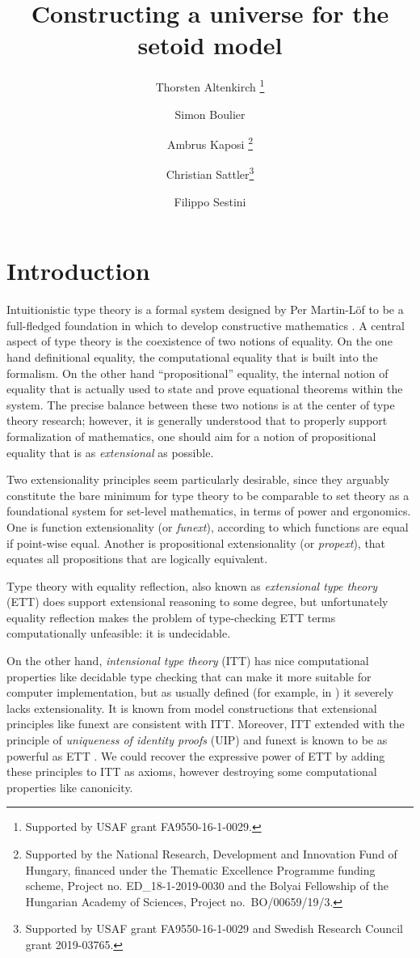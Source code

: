 \documentclass{easychair}
\title{Constructing a universe for the setoid model}
\author{
  Thorsten Altenkirch \inst{1}\thanks{Supported by USAF grant FA9550-16-1-0029.}
\and
  Simon Boulier \inst{2}
\and
  Ambrus Kaposi \inst{3}\thanks{Supported by the National Research, Development and Innovation Fund of Hungary, financed under the Thematic Excellence Programme funding scheme, Project no. ED\_18-1-2019-0030 and the Bolyai Fellowship of the Hungarian Academy of Sciences, Project no.\ BO/00659/19/3.}
\and
  Christian Sattler\inst{4}\thanks{Supported by USAF grant FA9550-16-1-0029 and Swedish Research Council grant 2019-03765.}
\and
  Filippo Sestini\inst{1}
}
\institute{
  School of Computer Science, University of Nottingham, UK\\
  \email{\{psztxa,pszcs1,psxfs5\}@nottingham.ac.uk}
  \and
  Inria, Nantes, France \\
  \email{simon.boulier@inria.fr}
  \and
  E{\"o}tv{\"o}s Lor{\'a}nd University, Budapest, Hungary\\
  \email{akaposi@inf.elte.hu}
  \and
  Chalmers University of Technology, Gothenburg, Sweden
  \email{sattler@chalmers.se}
}
\begin{document}
\maketitle

\section{Introduction}

Intuitionistic type theory is a formal system designed by Per Martin-L\"of to be
a full-fledged foundation in which to develop constructive mathematics
\cite{mltt75, libretto}.
%
A central aspect of type theory is the coexistence of two notions of
equality. On the one hand definitional equality, the computational equality that
is built into the formalism. On the other hand ``propositional'' equality, the
internal notion of equality that is actually used to state and prove equational
theorems within the system. The precise balance between these two notions is at
the center of type theory research; however, it is generally understood that to
properly support formalization of mathematics, one should aim for a notion of
propositional equality that is as \emph{extensional} as possible.

Two extensionality principles seem particularly desirable, since they arguably
constitute the bare minimum for type theory to be comparable to set theory as a
foundational system for set-level mathematics, in terms of power and ergonomics.
One is function extensionality (or \emph{funext}), according to which functions
are equal if point-wise equal. Another is propositional extensionality
(or \emph{propext}), that equates all propositions that are logically equivalent.

Type theory with equality reflection, also known as \emph{extensional type
  theory} (ETT) does support extensional reasoning to some degree, but
unfortunately equality reflection makes the problem of type-checking ETT terms
computationally unfeasible: it is undecidable.

On the other hand, \emph{intensional type theory} (ITT) has nice computational
properties like decidable type checking that can make it more suitable for
computer implementation, but as usually defined (for example, in \cite{mltt75})
it severely lacks extensionality.
%
It is known from model constructions that extensional principles like funext are
consistent with ITT.
%
Moreover, ITT extended with the principle of \emph{uniqueness of identity
  proofs} (UIP) and funext is known to be as powerful as ETT
\cite{conservativity}. We could recover the expressive power of ETT by adding
these principles to ITT as axioms, however destroying some computational
properties like canonicity.
\end{document}
